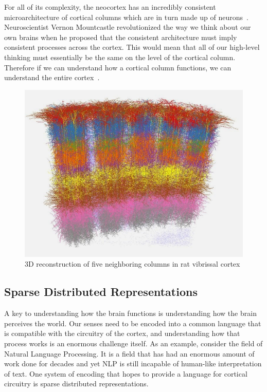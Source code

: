 \documentclass[oneside,12pt,openany]{book}
\begin{document}
	For all of its complexity, the neocortex has an incredibly consistent microarchitecture of cortical columns which are in turn made up of neurons~\cite{DiscoveriesBrainWorks}. Neuroscientist Vernon Mountcastle revolutionized the way we think about our own brains when he proposed that the consistent architecture must imply consistent processes across the cortex. This would mean that all of our high-level thinking must essentially be the same on the level of the cortical column. Therefore if we can understand how a cortical column functions, we can understand the entire cortex~\cite{DiscoveriesBrainWorks}.	
	
	\begin{figure}[!ht]
		\centering
		\includegraphics[width=.6\linewidth]{images/CorticalColumns.jpg}
		\caption[3D reconstruction of five neighboring columns in rat vibrissal cortex]{3D reconstruction of five neighboring columns in rat vibrissal cortex\footnotemark}
		\label{CorticalColumn}
	\end{figure}
	
	\subsection{Sparse Distributed Representations}\label{sec:sdr}
	
	A key to understanding how the brain functions is understanding how the brain perceives the world. Our senses need to be encoded into a common language that is compatible with the circuitry of the cortex, and understanding how that process works is an enormous challenge itself. As an example, consider the field of Natural Language Processing. It is a field that has had an enormous amount of work done for decades and yet NLP is still incapable of human-like interpretation of text. One system of encoding that hopes to provide a language for cortical circuitry is sparse distributed representations.
	
\end{document}
